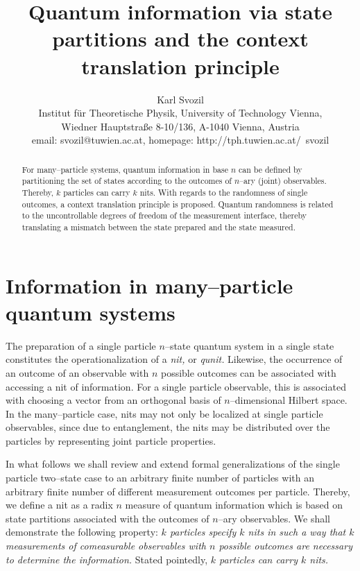 \documentclass{article}
\begin{document}
\title{Quantum information via state partitions and the context translation principle}
\author{Karl Svozil\\
Institut f\"ur Theoretische Physik, University of Technology Vienna,  \\
Wiedner Hauptstra\ss e 8-10/136, A-1040 Vienna, Austria\\
email: svozil@tuwien.ac.at, homepage: http://tph.tuwien.ac.at/~svozil}

\maketitle

\begin{abstract}
For many--particle systems, quantum information in base $n$
can be defined by partitioning the set of states according to the outcomes
of $n$--ary (joint) observables.
Thereby, $k$ particles can carry $k$ nits.
With regards to the randomness of single outcomes,
a context translation principle is proposed.
Quantum randomness is related
to the uncontrollable degrees of freedom of the measurement interface,
thereby translating a mismatch between the state prepared and the state measured.
\end{abstract}






\section{Information in many--particle quantum systems}

The preparation of a single particle $n$--state quantum system in a single state constitutes
the operationalization of a {\em nit,} or {\em qunit.}
Likewise, the occurrence of an outcome of an observable with $n$ possible outcomes
can be associated with accessing a  nit of information.
For a single particle observable,
this is associated with choosing a vector from an orthogonal basis of $n$--dimensional Hilbert space.
In the many--particle case,
nits may not only be localized at single particle observables, since
due to entanglement, the nits may be distributed
over the particles by representing joint particle properties.

In what follows we shall review
and extend formal generalizations \cite{DonSvo01,svozil-2002-statepart-prl}
of the single particle two--state case
to an arbitrary finite number of particles
with an arbitrary finite number of different measurement outcomes per particle.
Thereby, we define a nit as a radix $n$ measure of quantum information which
is based on state partitions associated with the outcomes of
$n$--ary observables.
We shall demonstrate the following property:
{\em
$k$ particles specify $k$ nits in such a way that $k$
measurements of comeasurable observables with $n$ possible outcomes are necessary to determine the information.}
Stated pointedly,
{\em
$k$ particles can carry $k$ nits.
}
\end{document}
